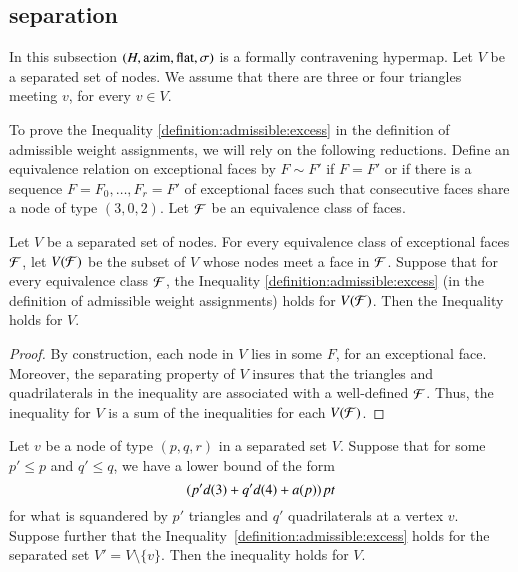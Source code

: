 \subsection{separation} %
\label{sec:2.7} \label{sec:tri34}

In this subsection $(H,{\operatorname{azim}},\operatorname{flat},\sigma)$ is a formally
contravening hypermap.  Let $V$ be a separated set of nodes.  We
assume that there are three or four triangles meeting $v$, for every
$v\in V$.

To prove the Inequality \ref{definition:admissible:excess} in the
definition of admissible weight assignments, we will rely on the
following reductions. Define an equivalence relation on exceptional
faces by $F\sim F'$ if $F=F'$ or if there is a sequence
$F=F_0,\ldots, F_r=F'$ of exceptional faces such that consecutive
faces share a node of type $(3,0,2)$. Let ${\cal F}$ be an
equivalence class of faces.

\begin{lemma} Let $V$ be a separated set of nodes.  For every
equivalence class of exceptional faces $\cal F$, let $V({\cal F})$
be the subset of $V$ whose nodes meet a face in ${\cal F}$. Suppose
that for every equivalence class $\cal F$, the Inequality
\ref{definition:admissible:excess} (in the definition of admissible
weight assignments) holds for $V({\cal F})$. Then the Inequality
holds for $V$.
\end{lemma}

\begin{proof}
By construction, each node in $V$ lies in some $F$, for an
exceptional face.  Moreover, the separating property of $V$ insures
that the triangles and quadrilaterals in the inequality are
associated with a well-defined  ${\cal F}$. Thus, the inequality for
$V$ is a sum of the inequalities for each $V({\cal F})$.
\end{proof}


\begin{lemma}
\label{lemma:split}
 Let $v$ be a node of type $(p,q,r)$ in a separated set $V$.  Suppose that
for some $p'\le p$ and $q'\le q$, we have a lower bound of the form
    $$( p' d(3) + q' d(4) + a(p))\,\hbox{\it pt}$$
for what is squandered by $p'$ triangles and $q'$ quadrilaterals at 
a vertex $v$.  Suppose further that the
Inequality~\ref{definition:admissible:excess}  holds for
the separated set $V' = V\setminus \{v\}$. Then the inequality holds
for $V$.
\end{lemma}

